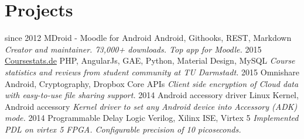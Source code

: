 \documentclass[]{friggeri-cv}
\begin{document}
\section{Projects}
\begin{entrylist}
  \entry
    {since 2012}
    {MDroid - Moodle for Android}
    {Android, Githooks, REST, Markdown}
    {\emph{Creator and maintainer. 73,000+ downloads. Top app for Moodle.}}
  \entry
    {2015}
    {\href{https://coursestats.de}{Coursestats.de}}
    {PHP, AngularJs, GAE, Python, Material Design, MySQL}
    {\emph{Course statistics and reviews from student community at TU Darmstadt.}}
  \entry
    {2015}
    {Omnishare}
    {Android, Cryptography, Dropbox Core APIs}
    {\emph{Client side encryption of Cloud data with easy-to-use file sharing support.}}
  \entry
    {2014}
    {Android accessory driver}
    {Linux Kernel, Android accessory}
    {\emph{Kernel driver to set any Android device into Accessory (ADK) mode.}}
  \entry
    {2014}
    {Programmable Delay Logic}
    {Verilog, Xilinx ISE, Virtex 5}
    {\emph{Implemented PDL on virtex 5 FPGA. Configurable precision of 10 picoseconds.}}
\end{entrylist}
\end{document}
